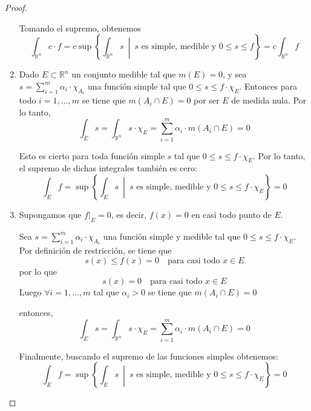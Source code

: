 \begin{proof}
\begin{enumerate}
              Tomando el supremo, obtenemos $$ \int_{\mathbb{R}^n} c \cdot f = c \sup \left\{
                  \int_{\mathbb{R}^n} s \ \middle| \ s \text{ es simple, medible y } 0 \leq s
                  \leq f \right\} = c \int_{\mathbb{R}^n} f $$

        \item Dado $E \subset \mathbb{R}^n$ un conjunto medible tal que $m(E) = 0$, y sea $s
                  = \sum_{i=1}^m \alpha_i \cdot \chi_{A_i}$ una función simple tal que $0 \leq s
                  \leq f \cdot \chi_E$. Entonces para todo $i = 1, \dots, m$ se tiene que $m(A_i
                  \cap E) = 0$ por ser $E$ de medida nula. Por lo tanto,
              \[
                  \int_E s = \int_{\mathbb{R}^n} s \cdot \chi_E = \sum_{i=1}^m \alpha_i \cdot m(A_i \cap E) = 0
              \]

              Esto es cierto para toda función simple $s$ tal que $0 \leq s \leq f \cdot
                  \chi_E$. Por lo tanto, el supremo de dichas integrales también es cero:
              \[
                  \int_E f = \sup \left\{ \int_E s \ \middle| \ s \text{ es simple, medible y } 0 \leq s \leq f \cdot \chi_E
                  \right\} = 0
              \]

        \item Supongamos que \( f|_E = 0 \), es decir, \( f(x) = 0 \) en casi todo punto de
              \( E \).

              Sea \( s = \sum_{i=1}^{m} \alpha_i \cdot \chi_{A_i} \) una función simple y
              medible tal que \( 0 \leq s \leq f \cdot \chi_E \). Por definición de
              restricción, se tiene que
              \[
                  s(x) \leq f(x) = 0 \quad \text{para casi todo } x \in E
              \]
              por lo que
              \[
                  s(x) = 0 \quad \text{para casi todo } x \in E
              \]
              Luego $\forall i = 1, \dots, m$ tal que $\alpha_i > 0$ se tiene que $m(A_i \cap
                  E) = 0$

              entonces,
              \[
                  \int_E s = \int_{\mathbb{R}^n} s \cdot \chi_E = \sum_{i=1}^{m} \alpha_i \cdot m(A_i \cap E) = 0
              \]

              Finalmente, buscando el supremo de las funciones simples obtenemos:
              \[
                  \int_E f = \sup \left\{ \int_E s \ \middle| \ s \text{ es simple, medible y } 0 \leq s \leq f \cdot \chi_E
                  \right\} = 0
              \]


\end{enumerate}
\end{proof}
